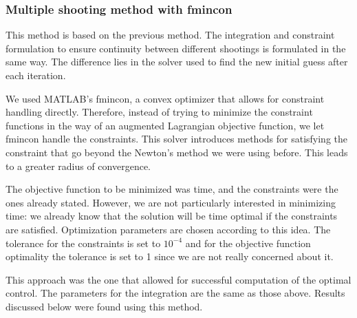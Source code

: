 \subsubsection{Multiple shooting method with fmincon}
This method is based on the previous method. The integration and constraint formulation to ensure continuity between different shootings is formulated in the same way. The difference lies in the solver used to find the new initial guess after each iteration.

We used MATLAB's fmincon, a convex optimizer that allows for constraint handling directly. Therefore, instead of trying to minimize the constraint functions in the way of an augmented Lagrangian objective function, we let fmincon handle the constraints. This solver introduces methods for satisfying the constraint that go beyond the Newton's method we were using before. This leads to a greater radius of convergence.

The objective function to be minimized was time, and the constraints were the ones already stated. However, we are not particularly interested in minimizing time: we already know that the solution will be time optimal if the constraints are satisfied. Optimization parameters are chosen according to this idea. The tolerance for the constraints is set to $10^{-4}$ and for the objective function optimality the tolerance is set to 1 since we are not really concerned about it.

This approach was the one that allowed for successful computation of the optimal control. The parameters for the integration are the same as those above. Results discussed below were found using this method.
